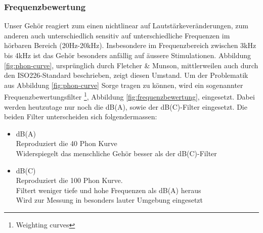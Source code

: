 \documentclass[12pt]{article}
\begin{document}
	\subsubsection*{Frequenzbewertung} \label{Frequenzbewertung}
	Unser Gehör reagiert zum einen nichtlinear auf Lautstärkeveränderungen, zum anderen auch unterschiedlich sensitiv auf unterschiedliche Frequenzen im hörbaren Bereich (20Hz-20kHz). Insbesondere im Frequenzbereich zwischen 3kHz bis 4kHz \cite{impairments_basics_2004} ist das Gehör besonders anfällig auf äussere Stimulationen. Abbildung \ref{fig:phon-curve}, ursprünglich durch Fletcher \& Munson, mittlerweilen auch durch den ISO226-Standard beschrieben, zeigt diesen Umstand. Um der Problematik aus Abbildung \ref{fig:phon-curve} Sorge tragen zu können, wird ein sogenannter Frequenzbewertungsfilter \footnote{ Weighting curves}, Abbildung \ref{fig:frequenzbewertung}, eingesetzt. Dabei werden heutzutage nur noch die dB(A), sowie der dB(C)-Filter eingesetzt. Die beiden Filter unterscheiden sich folgendermassen:
	\begin{itemize}
		\item dB(A) \\
		Reproduziert die 40 Phon Kurve \\
		Widerspiegelt das menschliche Gehör besser als der dB(C)-Filter
		\item dB(C) \\
		Reproduziert die 100 Phon Kurve.\\
		Filtert weniger tiefe und hohe Frequenzen als dB(A) heraus\\
		Wird zur Messung in besonders lauter Umgebung eingesetzt
	\end{itemize}
\end{document}
